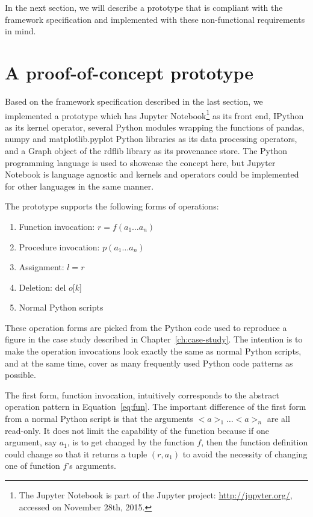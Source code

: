 In the next section, we will describe a prototype that is compliant with the framework specification and implemented with these non-functional requirements in mind.



\section{A proof-of-concept prototype}
\label{sec:prototype}
Based on the framework specification described in the last section, we implemented a prototype which has Jupyter Notebook\footnote{The Jupyter Notebook is part of the Jupyter project: \url{http://jupyter.org/}, accessed on November 28th, 2015.} as its front end, IPython as its kernel operator, several Python modules wrapping the functions of pandas, numpy and matplotlib.pyplot Python libraries as its data processing operators, and a Graph object of the rdflib library as its provenance store. The Python programming language is used to showcase the concept here, but Jupyter Notebook is language agnostic and kernels and operators could be implemented for other languages in the same manner.

The prototype supports the following forms of operations:
\begin{enumerate}
	\item Function invocation: $r = f(a_1\dots a_n)$
	\item Procedure invocation: $p(a_1\dots a_n)$
	\item Assignment: $l = r$
	\item Deletion: del $o$[$k$]
	\item Normal Python scripts
\end{enumerate}
These operation forms are picked from the Python code used to reproduce a figure in the case study described in Chapter~\ref{ch:case-study}. The intention is to make the operation invocations look exactly the same as normal Python scripts, and at the same time, cover as many frequently used Python code patterns as possible.

The first form, function invocation, intuitively corresponds to the abstract operation pattern in Equation~\ref{eq:fun}. The important difference of the first form from a normal Python script is that the arguments $<a>_1\dots<a>_n$ are all read-only. It does not limit the capability of the function because if one argument, say $a_1$, is to get changed by the function $f$, then the function definition could change so that it returns a tuple $(r, a_1)$ to avoid the necessity of changing one of function $f$'s arguments.

